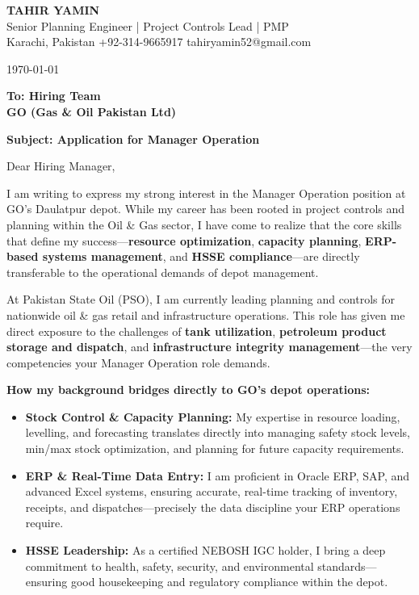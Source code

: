 \documentclass[11pt,a4paper]{article}
\begin{document}
\begin{center}
    {\Huge \textbf{\color{awesome-darknight} TAHIR YAMIN}} \\[0.2cm]
    {\Large \color{awesome-gray} Senior Planning Engineer | Project Controls Lead | PMP} \\[0.3cm]
    
    \small \color{light-gray}
    Karachi, Pakistan \quad \textbullet \quad 
    +92-314-9665917 \quad \textbullet \quad 
    tahiryamin52@gmail.com
\end{center}

\vspace{0.8cm}
\today
\vspace{0.5cm}

\textbf{To: Hiring Team} \\
\textbf{GO (Gas \& Oil Pakistan Ltd)} \\
\vspace{0.5cm}

\textbf{Subject: Application for Manager Operation}

\vspace{0.5cm}

Dear Hiring Manager,

I am writing to express my strong interest in the Manager Operation position at GO's Daulatpur depot. While my career has been rooted in project controls and planning within the Oil \& Gas sector, I have come to realize that the core skills that define my success—\textbf{resource optimization}, \textbf{capacity planning}, \textbf{ERP-based systems management}, and \textbf{HSSE compliance}—are directly transferable to the operational demands of depot management.

At Pakistan State Oil (PSO), I am currently leading planning and controls for nationwide oil \& gas retail and infrastructure operations. This role has given me direct exposure to the challenges of \textbf{tank utilization}, \textbf{petroleum product storage and dispatch}, and \textbf{infrastructure integrity management}—the very competencies your Manager Operation role demands.

\textbf{How my background bridges directly to GO's depot operations:}
\begin{itemize}
    \item \textbf{Stock Control \& Capacity Planning:} My expertise in resource loading, levelling, and forecasting translates directly into managing safety stock levels, min/max stock optimization, and planning for future capacity requirements.
    \item \textbf{ERP \& Real-Time Data Entry:} I am proficient in Oracle ERP, SAP, and advanced Excel systems, ensuring accurate, real-time tracking of inventory, receipts, and dispatches—precisely the data discipline your ERP operations require.
    \item \textbf{HSSE Leadership:} As a certified NEBOSH IGC holder, I bring a deep commitment to health, safety, security, and environmental standards—ensuring good housekeeping and regulatory compliance within the depot.
\end{itemize}
\end{document}
